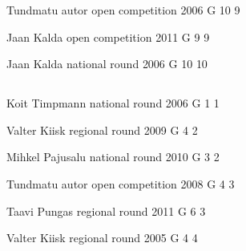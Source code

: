 \documentclass[11pt]{article}
\begin{document}
\ylDisplay{} %
{Tundmatu autor} %
{open competition} %
{2006} %
{G 10} %
{9} %
{

\ifEngStatement
\fi
}

\ylDisplay{} %
{Jaan Kalda} %
{open competition} %
{2011} %
{G 9} %
{9} %
{

\ifEngStatement
\fi
}

\ylDisplay{} %
{Jaan Kalda} %
{national round} %
{2006} %
{G 10} %
{10} %
{

\ifEngStatement
\fi
}
\newpage\subsection{\protect{}}

\ylDisplay{} %
{Koit Timpmann} %
{national round} %
{2006} %
{G 1} %
{1} %
{

\ifEngStatement
\fi
}

\ylDisplay{} %
{Valter Kiisk} %
{regional round} %
{2009} %
{G 4} %
{2} %
{

\ifEngStatement
\fi
}

\ylDisplay{} %
{Mihkel Pajusalu} %
{national round} %
{2010} %
{G 3} %
{2} %
{

\ifEngStatement
\fi
}

\ylDisplay{} %
{Tundmatu autor} %
{open competition} %
{2008} %
{G 4} %
{3} %
{

\ifEngStatement
\fi
}

\ylDisplay{} %
{Taavi Pungas} %
{regional round} %
{2011} %
{G 6} %
{3} %
{

\ifEngStatement
\fi
}

\ylDisplay{} %
{Valter Kiisk} %
{regional round} %
{2005} %
{G 4} %
{4} %
{

\ifEngStatement
\fi
}
\end{document}
